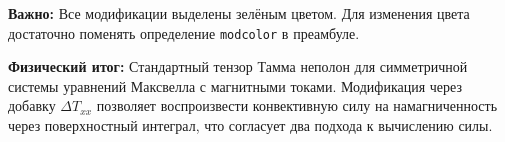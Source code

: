 \documentclass[a4paper,12pt]{article}
\begin{document}
\textbf{Важно:} Все модификации выделены \textcolor{modcolor}{зелёным цветом}.
Для изменения цвета достаточно поменять определение \texttt{modcolor} в преамбуле.

\textbf{Физический итог:} Стандартный тензор Тамма неполон для симметричной
системы уравнений Максвелла с магнитными токами. Модификация через добавку
$\Delta T_{xx}$ позволяет воспроизвести конвективную силу на намагниченность
через поверхностный интеграл, что согласует два подхода к вычислению силы.
\end{document}
